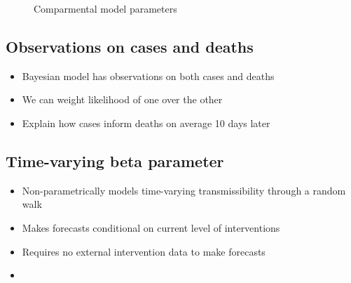 \documentclass[11pt]{amsart}
\begin{document}
 \begin{figure}
     

 \begin{center}
\end{center}
      \caption{Comparmental model parameters }
     \label{fig:seird}
 \end{figure}
 \subsection{Observations on cases and deaths}
 \begin{itemize}
 \item Bayesian model has observations on both cases and deaths
 \item We can weight likelihood of one over the other
 \item Explain how cases inform deaths on average 10 days later
 \end{itemize}
 
 \subsection{Time-varying beta parameter}
 \begin{itemize}
 \item Non-parametrically models time-varying transmissibility through a random walk
 \item Makes forecasts conditional on current level of interventions
 \item Requires no external intervention data to make forecasts 
 \item 
 \end{itemize}
 
\end{document}
